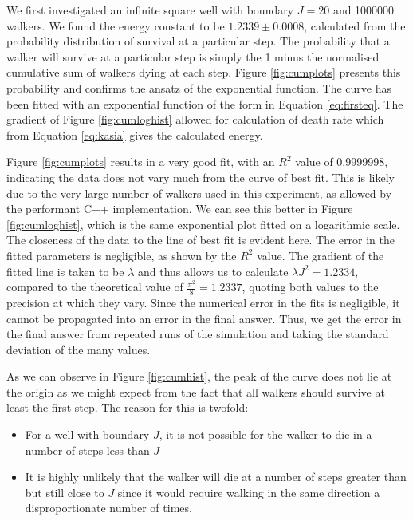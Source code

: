 \documentclass[journal]{IEEEtran}
\begin{document}

We first investigated an infinite square well with boundary $J=20$ and 1000000
walkers. We found the energy constant to be $1.2339 \pm 0.0008$, calculated from
the probability distribution of survival at a particular step. The probability
that a walker will survive at a particular step is simply the 1 minus the
normalised cumulative sum of walkers dying at each step. Figure
\ref{fig:cumplots} presents this probability and confirms the ansatz of the
exponential function. The curve has been fitted with an exponential function of
the form in Equation \ref{eq:firsteq}. The gradient of Figure
\ref{fig:cumloghist} allowed for calculation of death rate which from Equation
\ref{eq:kasia} gives the calculated energy.

Figure \ref{fig:cumplots} results in a very good fit, with an $R^2$ value of
0.9999998, indicating the data does not vary much from the curve of best
fit. This is likely due to the very large number of walkers used in this
experiment, as allowed by the performant C++ implementation.  We can see this
better in Figure \ref{fig:cumloghist}, which is the same exponential plot fitted
on a logarithmic scale. The closeness of the data to the line of best fit is
evident here. The error in the fitted parameters is negligible, as shown by the
$R^2$ value. The gradient of the fitted line is taken to be $\lambda$ and thus
allows us to calculate $\lambda J^2 = 1.2334$, compared to the theoretical value
of $\frac{\pi^2}{8} = 1.2337$, quoting both values to the precision at which
they vary. Since the numerical error in the fits is negligible, it cannot be
propagated into an error in the final answer. Thus, we get the error in the
final answer from repeated runs of the simulation and taking the standard
deviation of the many values.

As we can observe in Figure \ref{fig:cumhist}, the peak of the curve does not
lie at the origin as we might expect from the fact that all walkers should
survive at least the first step. The reason for this is twofold:
\begin{itemize}
\item For a well with boundary $J$, it is not possible for the walker to die in
  a number of steps less than $J$
\item It is highly unlikely that the walker will die at a number of steps
  greater than but still close to $J$ since it would require walking in the same
  direction a disproportionate number of times.
\end{itemize}
\end{document}

